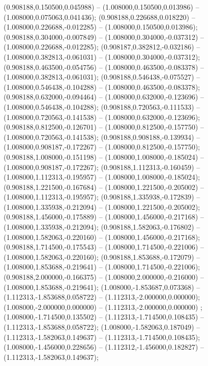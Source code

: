  (0.908188,0.150500,0.045988) -- (1.008000,0.150500,0.013986) -- (1.008000,0.075063,0.041436);
 (0.908188,0.226688,0.018220) -- (1.008000,0.226688,-0.012285) -- (1.008000,0.150500,0.013986);
 (0.908188,0.304000,-0.007849) -- (1.008000,0.304000,-0.037312) -- (1.008000,0.226688,-0.012285);
 (0.908187,0.382812,-0.032186) -- (1.008000,0.382813,-0.061031) -- (1.008000,0.304000,-0.037312);
 (0.908188,0.463500,-0.054756) -- (1.008000,0.463500,-0.083378) -- (1.008000,0.382813,-0.061031);
 (0.908188,0.546438,-0.075527) -- (1.008000,0.546438,-0.104288) -- (1.008000,0.463500,-0.083378);
 (0.908188,0.632000,-0.094464) -- (1.008000,0.632000,-0.123696) -- (1.008000,0.546438,-0.104288);
 (0.908188,0.720563,-0.111533) -- (1.008000,0.720563,-0.141538) -- (1.008000,0.632000,-0.123696);
 (0.908188,0.812500,-0.126701) -- (1.008000,0.812500,-0.157750) -- (1.008000,0.720563,-0.141538);
 (0.908188,0.908188,-0.139934) -- (1.008000,0.908187,-0.172267) -- (1.008000,0.812500,-0.157750);
 (0.908188,1.008000,-0.151198) -- (1.008000,1.008000,-0.185024) -- (1.008000,0.908187,-0.172267);
 (0.908188,1.112313,-0.160459) -- (1.008000,1.112313,-0.195957) -- (1.008000,1.008000,-0.185024);
 (0.908188,1.221500,-0.167684) -- (1.008000,1.221500,-0.205002) -- (1.008000,1.112313,-0.195957);
 (0.908188,1.335938,-0.172839) -- (1.008000,1.335938,-0.212094) -- (1.008000,1.221500,-0.205002);
 (0.908188,1.456000,-0.175889) -- (1.008000,1.456000,-0.217168) -- (1.008000,1.335938,-0.212094);
 (0.908188,1.582063,-0.176802) -- (1.008000,1.582063,-0.220160) -- (1.008000,1.456000,-0.217168);
 (0.908188,1.714500,-0.175543) -- (1.008000,1.714500,-0.221006) -- (1.008000,1.582063,-0.220160);
 (0.908188,1.853688,-0.172079) -- (1.008000,1.853688,-0.219641) -- (1.008000,1.714500,-0.221006);
 (0.908188,2.000000,-0.166375) -- (1.008000,2.000000,-0.216000) -- (1.008000,1.853688,-0.219641);
 (1.008000,-1.853687,0.073368) -- (1.112313,-1.853688,0.058722) -- (1.112313,-2.000000,0.000000);
 (1.008000,-2.000000,0.000000) -- (1.112313,-2.000000,0.000000) ;
 (1.008000,-1.714500,0.135502) -- (1.112313,-1.714500,0.108435) -- (1.112313,-1.853688,0.058722);
 (1.008000,-1.582063,0.187049) -- (1.112313,-1.582063,0.149637) -- (1.112313,-1.714500,0.108435);
 (1.008000,-1.456000,0.228656) -- (1.112312,-1.456000,0.182827) -- (1.112313,-1.582063,0.149637);
